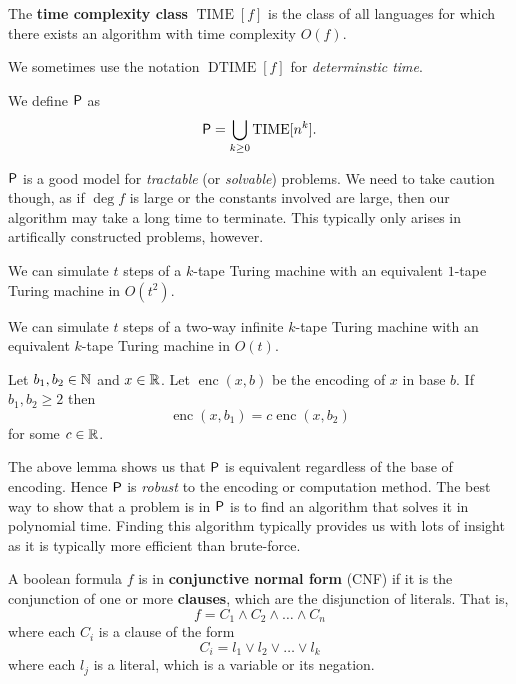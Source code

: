 \begin{definition}
    The \textbf{time complexity class} $\operatorname{TIME}[f]$
    is the class of all languages for which
    there exists an algorithm with time complexity $O(f)$.
\end{definition}

\begin{remark}
    We sometimes use the notation $\operatorname{DTIME}[f]$ for
    \emph{determinstic time}.
\end{remark}

\begin{definition}[$\poly$]
    We define $\poly$ as
    \[
        \mathsf P = \bigcup_{k \geq 0} \operatorname{TIME}[n^k].
    \]
\end{definition}

$\poly$ is a good model for \emph{tractable} (or \emph{solvable}) 
problems. 
We need to take caution though, as if $\deg f$ is large
or the constants involved are large, 
then our algorithm may take a long time to terminate.
This typically only arises in artifically constructed problems,
however.

\begin{lemma}[]
    We can simulate $t$ steps of a $k$-tape Turing machine
    with an equivalent $1$-tape Turing machine in $O(t^2)$.
\end{lemma}

\begin{lemma}[]
    We can simulate $t$ steps of a two-way infinite $k$-tape
    Turing machine with an equivalent $k$-tape Turing machine
    in $O(t)$.
\end{lemma}

\begin{lemma}[]
    Let $b_1, b_2 \in \mathbb{N}$ and $x \in \mathbb{R}$.
    Let $\operatorname{enc}(x,b)$ be the encoding of $x$ in base $b$.
    If $b_1, b_2 \geq 2$ then
    \[
        \operatorname{enc}(x,b_1) = c\operatorname{enc}(x,b_2)
    \]
    for some $c \in \mathbb{R}$.
\end{lemma}

The above lemma shows us that $\poly$ is equivalent
regardless of the base of encoding.
Hence $\poly$ is \emph{robust} to the encoding or computation method.
The best way to show that a problem is in $\poly$ 
is to find an algorithm that solves it in polynomial time.
Finding this algorithm typically provides us with lots of insight
as it is typically more efficient than brute-force.

\begin{definition}
    A boolean formula $f$ is in \textbf{conjunctive normal form} (CNF)
    if it is the conjunction of one or more \textbf{clauses},
    which are the disjunction of literals.
    That is,
    \[
        f = C_1 \land C_2 \land \ldots \land C_n
    \]
    where each $C_i$ is a clause of the form
    \[
        C_i = l_1 \lor l_2 \lor \ldots \lor l_k
    \]
    where each $l_j$ is a literal, 
    which is a variable or its negation.
\end{definition}

